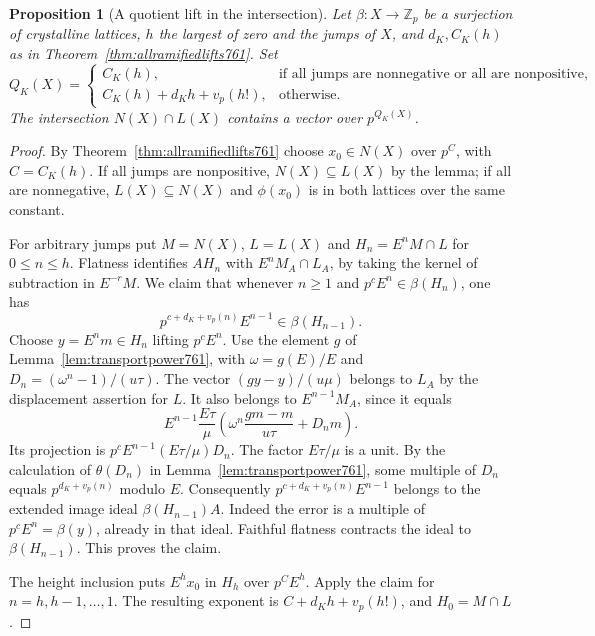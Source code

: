 \documentclass[a4paper,11pt]{article}
\newtheorem{proposition}{Proposition}[section]
\theoremstyle{definition}
\theoremstyle{remark}
\newcommand{\ZZ}{\mathbb Z}\newcommand{\ord}{\operatorname{ord}}
\numberwithin{equation}{section}
\begin{document}
\begin{proposition}[A quotient lift in the intersection]
\leavevmode\label{prop:commonlift762}
Let \(\beta:X\to\ZZ_p\) be a surjection of crystalline
lattices, \(h\) the largest of zero and the jumps of \(X\),
and \(d_K,C_K(h)\) as in Theorem~\ref{thm:allramifiedlifts761}.
Set
\[
 Q_K(X)=
 \begin{cases}
 C_K(h),&\text{if all jumps are nonnegative or all are nonpositive},\\
 C_K(h)+d_Kh+v_p(h!),&\text{otherwise}.
 \end{cases}
\]
The intersection \(N(X)\cap L(X)\) contains a vector over
\(p^{Q_K(X)}\).
\end{proposition}
\begin{proof}
By Theorem~\ref{thm:allramifiedlifts761} choose
\(x_0\in N(X)\) over \(p^C\), with \(C=C_K(h)\).
If all jumps are nonpositive, \(N(X)\subseteq L(X)\) by
the lemma; if all are nonnegative, \(L(X)\subseteq N(X)\)
and \(\phi(x_0)\) is in both lattices over the same constant.

For arbitrary jumps put \(M=N(X)\), \(L=L(X)\) and
\(H_n=E^n M\cap L\) for \(0\le n\le h\). Flatness identifies
\(A H_n\) with \(E^n M_A\cap L_A\), by taking the kernel
of subtraction in \(E^{-r}M\). We claim that whenever
\(n\ge1\) and \(p^cE^n\in\beta(H_n)\), one has
\[
                 p^{c+d_K+v_p(n)}E^{n-1}\in\beta(H_{n-1}).
\]
Choose \(y=E^n m\in H_n\) lifting \(p^cE^n\). Use the
element \(g\) of Lemma~\ref{lem:transportpower761}, with
\(\omega=g(E)/E\) and \(D_n=(\omega^n-1)/(u\tau)\).
The vector \((gy-y)/(u\mu)\) belongs to \(L_A\) by the
displacement assertion for \(L\). It also belongs to
\(E^{n-1}M_A\), since it equals
\[
 E^{n-1}\frac{E\tau}{\mu}
      \left(\omega^n\frac{gm-m}{u\tau}+D_n m\right).
\]
Its projection is \(p^c E^{n-1}(E\tau/\mu)D_n\).
The factor \(E\tau/\mu\) is a unit. By the calculation of
\(\theta(D_n)\) in Lemma~\ref{lem:transportpower761}, some
multiple of \(D_n\) equals \(p^{d_K+v_p(n)}\) modulo \(E\).
Consequently \(p^{c+d_K+v_p(n)}E^{n-1}\) belongs to the
extended image ideal \(\beta(H_{n-1})A\). Indeed the error
is a multiple of \(p^cE^n=\beta(y)\), already in that ideal.
Faithful flatness contracts the ideal to \(\beta(H_{n-1})\).
This proves the claim.

The height inclusion puts \(E^hx_0\) in \(H_h\) over
\(p^CE^h\). Apply the claim for \(n=h,h-1,\ldots,1\).
The resulting exponent is \(C+d_K h+v_p(h!)\), and
\(H_0=M\cap L\).
\end{proof}
\end{document}
